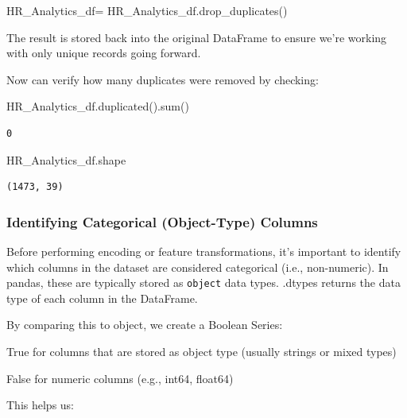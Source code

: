 \documentclass[
  letterpaper,
  DIV=11,
  numbers=noendperiod]{scrartcl}
\newenvironment{Shaded}{\begin{snugshade}}{\end{snugshade}}
\newcommand{\BuiltInTok}[1]{\textcolor[rgb]{0.00,0.23,0.31}{#1}}
\newcommand{\NormalTok}[1]{\textcolor[rgb]{0.00,0.23,0.31}{#1}}
\newcommand{\OperatorTok}[1]{\textcolor[rgb]{0.37,0.37,0.37}{#1}}
\begin{document}
\begin{Shaded}
\begin{Highlighting}[]
\NormalTok{HR\_Analytics\_df}\OperatorTok{=}\NormalTok{ HR\_Analytics\_df.drop\_duplicates()}
\end{Highlighting}
\end{Shaded}

The result is stored back into the original DataFrame to ensure we're
working with only unique records going forward.

Now can verify how many duplicates were removed by checking:

\begin{Shaded}
\begin{Highlighting}[]
\NormalTok{HR\_Analytics\_df.duplicated().}\BuiltInTok{sum}\NormalTok{()}
\end{Highlighting}
\end{Shaded}

\begin{verbatim}
0
\end{verbatim}

\begin{Shaded}
\begin{Highlighting}[]
\NormalTok{HR\_Analytics\_df.shape}
\end{Highlighting}
\end{Shaded}

\begin{verbatim}
(1473, 39)
\end{verbatim}

\subsubsection{Identifying Categorical (Object-Type)
Columns}\label{identifying-categorical-object-type-columns}

Before performing encoding or feature transformations, it's important to
identify which columns in the dataset are considered categorical (i.e.,
non-numeric). In pandas, these are typically stored as \texttt{object}
data types. .dtypes returns the data type of each column in the
DataFrame.

By comparing this to object, we create a Boolean Series:

True for columns that are stored as object type (usually strings or
mixed types)

False for numeric columns (e.g., int64, float64)

This helps us:
\end{document}
